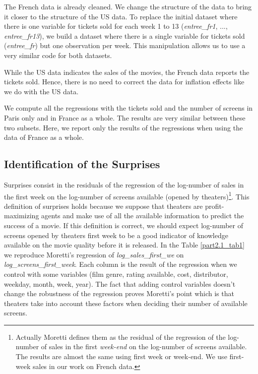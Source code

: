The French data is already cleaned.
We change the structure of the data to bring it closer to the structure of the US data.
To replace the initial dataset where there is one variable for tickets sold for each week 1 to 13 (\textit{entree\_fr1}, ..., \textit{entree\_fr13}), we build a dataset where there is a single variable for tickets sold (\textit{entree\_fr}) but one observation per week.
This manipulation allows us to use a very similar code for both datasets.

While the US data indicates the sales of the movies, the French data reports the tickets sold. 
Hence, there is no need to correct the data for inflation effects like we do with the US data.

We compute all the regressions with the tickets sold and the number of screens in Paris only and in France as a whole.
The results are very similar between these two subsets.
Here, we report only the results of the regressions when using the data of France as a whole.

\subsection{Identification of the Surprises}\label{subsec2.1}

Surprises consist in the residuals of the regression of the log-number of sales in the first week on the log-number of screens available (opened by theaters)\footnote{Actually Moretti defines them as the residual of the regression of the log-number of sales in the first \textit{week-end} on the log-number of screens available. The results are almost the same using first week or week-end. We use first-week sales in our work on French data.}.
This definition of surprises holds because we suppose that theaters are profit-maximizing agents and make use of all the available information to predict the success of a movie. If this definition is correct, we should expect log-number of screens opened by theaters first week to be a good indicator of knowledge available on the movie quality before it is released. In the Table \ref{part2.1_tab1} we reproduce Moretti's regression of \textit{log\_sales\_first\_we} on \textit{log\_screens\_first\_week}. Each column is the result of the regression when we control with some variables (film genre, rating available, cost, distributor, weekday, month, week, year). The fact that adding control variables doesn't change the robustness of the regression proves Moretti's point which is that theaters take into account these factors when deciding their number of available screens. 

